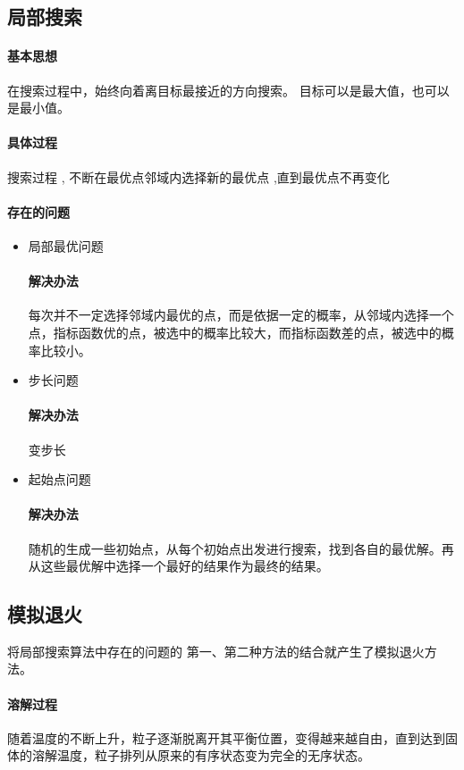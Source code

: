 \documentclass[UTF8,a4paper]{ctexart}
\begin{document}
\subsection{局部搜索}
\paragraph{基本思想}在搜索过程中，始终向着离目标最接近的方向搜索。
目标可以是最大值，也可以是最小值。

\paragraph{具体过程} 搜索过程 , 不断在最优点邻域内选择新的最优点 ,直到最优点不再变化

\paragraph{存在的问题}
\begin{itemize}
	\item 局部最优问题
	      \paragraph{解决办法} 每次并不一定选择邻域内最优的点，而是依据一定的概率，从邻域内选择一个点，指标函数优的点，被选中的概率比较大，而指标函数差的点，被选中的概率比较小。
	\item 步长问题
	      \paragraph{解决办法}变步长

	\item 起始点问题
	      \paragraph{解决办法}随机的生成一些初始点，从每个初始点出发进行搜索，找到各自的最优解。再从这些最优解中选择一个最好的结果作为最终的结果。
\end{itemize}

\subsection{模拟退火}
将局部搜索算法中存在的问题的 	第一、第二种方法的结合就产生了模拟退火方法。

\paragraph{溶解过程}随着温度的不断上升，粒子逐渐脱离开其平衡位置，变得越来越自由，直到达到固体的溶解温度，粒子排列从原来的有序状态变为完全的无序状态。
\end{document}
